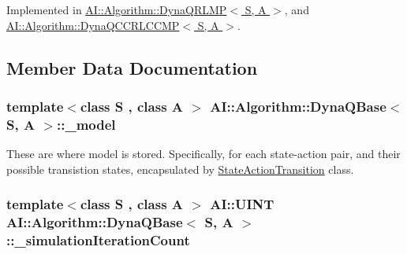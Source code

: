 Implemented in \hyperlink{classAI_1_1Algorithm_1_1DynaQRLMP_a7b3b5f3706744290b12c19f786e5e4e4}{A\-I\-::\-Algorithm\-::\-Dyna\-Q\-R\-L\-M\-P$<$ S, A $>$}, and \hyperlink{classAI_1_1Algorithm_1_1DynaQCCRLCCMP_aebff9b81db5bd2ae33bd3d6662539bc0}{A\-I\-::\-Algorithm\-::\-Dyna\-Q\-C\-C\-R\-L\-C\-C\-M\-P$<$ S, A $>$}.



\subsection{Member Data Documentation}
\hypertarget{classAI_1_1Algorithm_1_1DynaQBase_a65878fdff793c8b4bef59bb128e19bd8}{
\subsubsection[{\-\_\-model}]{\setlength{\rightskip}{0pt plus 5cm}template$<$class S , class A $>$ {\bf A\-I\-::\-Algorithm\-::\-Dyna\-Q\-Base}$<$ S, A $>$\-::\-\_\-model\hspace{0.3cm}{\ttfamily [protected]}}}\label{classAI_1_1Algorithm_1_1DynaQBase_a65878fdff793c8b4bef59bb128e19bd8}
These are where model is stored. Specifically, for each state-\/action pair, and their possible transistion states, encapsulated by \hyperlink{classAI_1_1Algorithm_1_1StateActionTransition}{State\-Action\-Transition} class. \hypertarget{classAI_1_1Algorithm_1_1DynaQBase_a3d375c3e01c7cc8a30c92109780adb9b}{
\subsubsection[{\-\_\-simulation\-Iteration\-Count}]{\setlength{\rightskip}{0pt plus 5cm}template$<$class S , class A $>$ {\bf A\-I\-::\-U\-I\-N\-T} {\bf A\-I\-::\-Algorithm\-::\-Dyna\-Q\-Base}$<$ S, A $>$\-::\-\_\-simulation\-Iteration\-Count\hspace{0.3cm}{\ttfamily [protected]}}}\label{classAI_1_1Algorithm_1_1DynaQBase_a3d375c3e01c7cc8a30c92109780adb9b}
